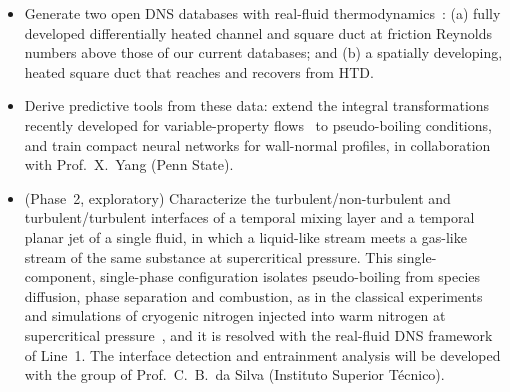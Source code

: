 \documentclass[11pt]{article}
\begin{document}
\begin{itemize}
  \item[\textbf{O1.}] Generate two open DNS databases with real-fluid
  thermodynamics~\cite{PengRobinson1976,Chung1988}: (a) fully developed differentially heated
  channel and square duct at friction Reynolds numbers above those of our current
  databases; and (b) a spatially developing, heated square duct that reaches and recovers
  from HTD.
  \item[\textbf{O2.}] Derive predictive tools from these data: extend the integral
  transformations recently developed for variable-property flows~\cite{Modesti2026} to
  pseudo-boiling conditions, and train compact neural networks for wall-normal profiles,
  in collaboration with Prof.\ X.\ Yang (Penn State).
  \item[\textbf{O3.}] (Phase~2, exploratory) Characterize the turbulent/non-turbulent and
  turbulent/turbulent interfaces of a temporal mixing layer and a temporal planar jet of a
  single fluid, in which a liquid-like stream meets a gas-like stream of the same substance at
  supercritical pressure. This single-component, single-phase configuration isolates
  pseudo-boiling from species diffusion, phase separation and combustion, as in the classical
  experiments and simulations of cryogenic nitrogen injected into warm nitrogen at
  supercritical pressure~\cite{Mayer2003,Muller2016,Lapenna2019}, and it is resolved with the
  real-fluid DNS framework of Line~1. The interface detection and entrainment analysis will be
  developed with the group of Prof.\ C.\ B.\ da Silva (Instituto Superior T\'ecnico).
\end{itemize}
\end{document}
